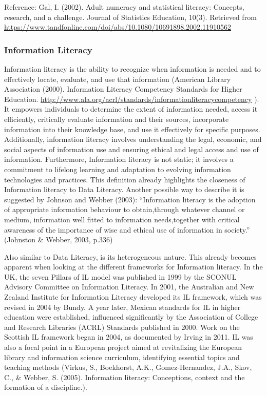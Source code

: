 \documentclass[
  12pt,
  a4paper,
  twoside]{article}
\begin{document}
Reference:
Gal, I. (2002). Adult numeracy and statistical literacy: Concepts, research, and a challenge. Journal of Statistics Education, 10(3). Retrieved from \url{https://www.tandfonline.com/doi/abs/10.1080/10691898.2002.11910562}

\hypertarget{information-literacy}{%
\subsubsection{Information Literacy}\label{information-literacy}}

Information literacy is the ability to recognize when information is needed and to effectively locate, evaluate, and use that information (American Library Association (2000). Information Literacy Competency Standards for Higher Education. \url{http://www.ala.org/acrl/standards/informationliteracycompetency} ). It empowers individuals to determine the extent of information needed, access it efficiently, critically evaluate information and their sources, incorporate information into their knowledge base, and use it effectively for specific purposes. Additionally, information literacy involves understanding the legal, economic, and social aspects of information use and ensuring ethical and legal access and use of information.
Furthermore, Information literacy is not static; it involves a commitment to lifelong learning and adaptation to evolving information technologies and practices.
This definition already highlights the closeness of Information literacy to Data Literacy.
Another possible way to describe it is suggested by Johnson and Webber (2003):
``Information literacy is the adoption of appropriate information behaviour to obtain,through whatever channel or medium, information well fitted to information needs,together with critical awareness of the importance of wise and ethical use of information in society.'' (Johnston \& Webber, 2003, p.336)

Also similar to Data Literacy, is its heterogeneous nature. This already becomes apparent when looking at the different frameworks for Information literacy. In the UK, the seven Pillars of IL model was published in 1999 by the SCONUL Advisory Committee on Information Literacy. In 2001, the Australian and New Zealand Institute for Information Literacy developed its IL framework, which was revised in 2004 by Bundy. A year later, Mexican standards for IL in higher education were established, influenced significantly by the Association of College and Research Libraries (ACRL) Standards published in 2000. Work on the Scottish IL framework began in 2004, as documented by Irving in 2011. IL was also a focal point in a European project aimed at revitalizing the European library and information science curriculum, identifying essential topics and teaching methods (Virkus, S., Boekhorst, A.K., Gomez-Hernandez, J.A., Skov, C., \& Webber, S. (2005). Information literacy: Conceptions, context and the formation of a discipline.).
\end{document}
